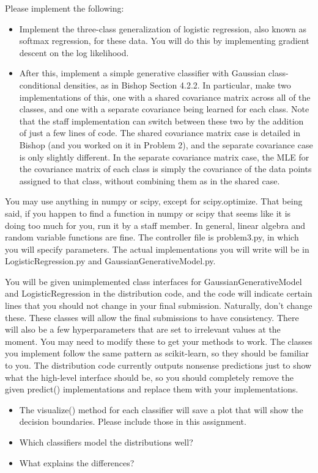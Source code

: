 \documentclass[submit]{harvardml}
\begin{document}
\begin{problem}
Please implement the following:
\begin{itemize}
\item Implement the three-class generalization of logistic regression, also
  known as softmax regression, for these data. You will do this by implementing
  gradient descent on the log likelihood. 
\item After this, implement a simple generative classifier with Gaussian
  class-conditional densities, as in Bishop Section 4.2.2. In particular, make
  two implementations of this, one with a shared covariance matrix across all of
  the classes, and one with a separate covariance being learned for each class.
  Note that the staff implementation can switch between these two by the
  addition of just a few lines of code. The shared covariance matrix case is
  detailed in Bishop (and you worked on it in Problem 2), and the separate covariance 
  case is only slightly different. In the separate covariance matrix case, the MLE for the
  covariance matrix of each class is simply the covariance of the data points assigned to that
  class, without combining them as in the shared case.
\end{itemize}
You may use anything in  numpy or scipy, except for scipy.optimize. That being said, if you happen to find a function in numpy or scipy that seems like it is doing too much for you, run it by a staff member. In general, linear algebra and random variable functions are fine. The controller file is problem3.py, in which you will specify parameters. The actual implementations you will write will be in LogisticRegression.py and GaussianGenerativeModel.py.


You will be given unimplemented class interfaces for GaussianGenerativeModel and LogisticRegression in the distribution code, 
and the code will indicate certain lines that you should not change in your final submission. Naturally, don't change these.
These classes will allow the final submissions to have consistency. There will also be a few hyperparameters that are set to
irrelevant values at the moment. You may need to modify these to get your methods to work.
The classes you implement follow the same pattern as scikit-learn, so they should be familiar to you. The distribution code currently outputs nonsense predictions just to show what the high-level interface should be, so you should completely remove the given predict() implementations and replace them with your implementations.

\begin{itemize}
\item The visualize() method for each classifier will save a plot that will show the decision boundaries. Please include those in this assignment.
\item Which classifiers model the distributions well? 
\item What explains the differences?
\end{itemize}
\end{problem}
\end{document}
